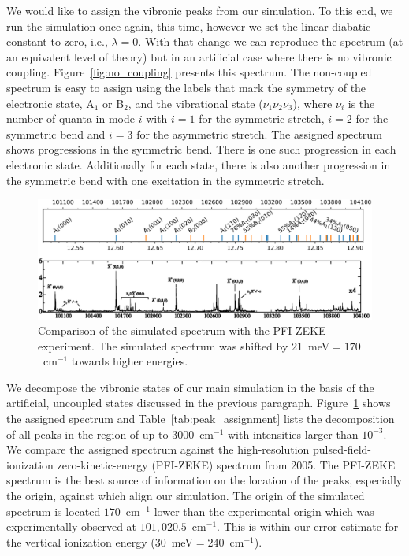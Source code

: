 \documentclass[12pt,a4paper,prb,aps,superscriptaddress]{revtex4}
\begin{document}
We would like to assign the vibronic peaks from our simulation. To this end,
we run the simulation once again, this time, however we set the linear
diabatic constant to zero, i.e., $\lambda = 0$. With that change we can
reproduce the spectrum (at an equivalent level of theory) but in an artificial
case where there is no vibronic coupling. Figure~\ref{fig:no_coupling}
presents this spectrum. The non-coupled spectrum is easy to assign using the
labels that mark the symmetry of the electronic state, A$_1$ or B$_2$, and the
vibrational state ($\nu _1 \nu_2 \nu_3$), where $\nu _i$ is the number of
quanta in mode $i$ with $i=1$ for the symmetric stretch, $i=2$ for the
symmetric bend and $i=3$ for the asymmetric stretch. The assigned spectrum
shows progressions in the symmetric bend. There is one such progression in
each electronic state.  Additionally for each state, there is also another
progression in the symmetric bend with one excitation in the symmetric
stretch.

\begin{figure}
    \includegraphics[width=16 cm]{./figures/sim_vs_zeke}
    \caption{
        Comparison of the simulated spectrum with the PFI-ZEKE
        experiment.\cite{Willitsch:O3ZEKE:2005} The simulated spectrum was
        shifted by $21$~meV$ = 170$~cm$^{-1}$ towards higher energies.
    }
    \label{fig:sim_vs_zeke}
\end{figure}

We decompose the vibronic states of our main simulation in the basis of the
artificial, uncoupled states discussed in the previous paragraph.
Figure~\ref{fig:sim_vs_zeke} shows the assigned spectrum and
Table~\ref{tab:peak_assignment} lists the decomposition of all peaks in the
region of up to $3000$~cm$^{-1}$ with intensities larger than $10^{-3}$. We
compare the assigned spectrum against the high-resolution
pulsed-field-ionization zero-kinetic-energy (PFI-ZEKE) spectrum from
2005.\cite{Willitsch:O3ZEKE:2005} The PFI-ZEKE spectrum is the best source of
information on the location of the peaks, especially the origin, against which
align our simulation. The origin of the simulated spectrum is located
$170$~cm$^{-1}$ lower than the experimental origin which was experimentally
observed at $101,020.5$~cm$^{-1}$.\cite{Willitsch:O3ZEKE:2005} This is within
our error estimate for the vertical ionization energy
($30$~meV$=240$~cm$^{-1}$).  
\end{document}
